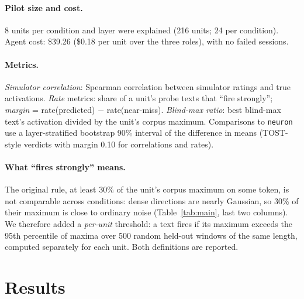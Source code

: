 \documentclass[11pt]{article}
\begin{document}
\paragraph{Pilot size and cost.} 8 units per condition and layer were explained (216 units; 24 per condition). Agent
cost: \$39.26 (\$0.18 per unit over the three roles), with no failed sessions.

\paragraph{Metrics.} \emph{Simulator correlation}: Spearman correlation between simulator ratings and true
activations. \emph{Rate} metrics: share of a unit's probe texts that ``fire strongly''; \emph{margin} =
rate(predicted) $-$ rate(near-miss). \emph{Blind-max ratio}: best blind-max text's activation divided by the unit's
corpus maximum. Comparisons to \texttt{neuron} use a layer-stratified bootstrap 90\% interval of the difference in
means (TOST-style verdicts with margin 0.10 for correlations and rates).

\paragraph{What ``fires strongly'' means.} The original rule, at least 30\% of the unit's corpus maximum on some
token, is not comparable across conditions: dense directions are nearly Gaussian, so 30\% of their maximum is close to
ordinary noise (Table~\ref{tab:main}, last two columns). We therefore added a \emph{per-unit} threshold: a text fires
if its maximum exceeds the 95th percentile of maxima over 500 random held-out windows of the same length, computed
separately for each unit. Both definitions are reported.

\section{Results}
\end{document}

